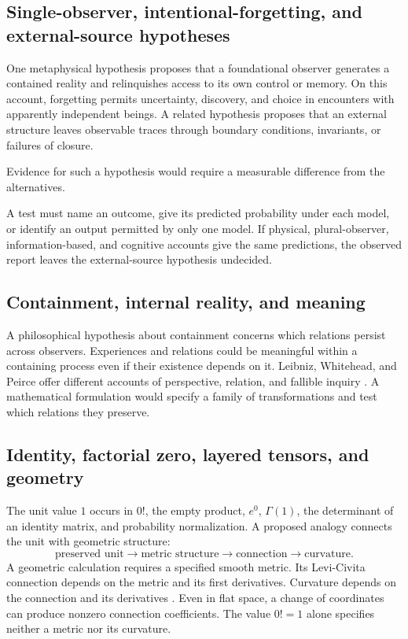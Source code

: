 \subsection{Single-observer, intentional-forgetting, and external-source hypotheses}

One metaphysical hypothesis proposes that a foundational observer generates a contained reality and relinquishes access to its own control or memory. On this account, forgetting permits uncertainty, discovery, and choice in encounters with apparently independent beings. A related hypothesis proposes that an external structure leaves observable traces through boundary conditions, invariants, or failures of closure.

Evidence for such a hypothesis would require a measurable difference from the alternatives.



A test must name an outcome, give its predicted probability under each model, or identify an output permitted by only one model. If physical, plural-observer, information-based, and cognitive accounts give the same predictions, the observed report leaves the external-source hypothesis undecided.

\subsection{Containment, internal reality, and meaning}

A philosophical hypothesis about containment concerns which relations persist across observers. Experiences and relations could be meaningful within a containing process even if their existence depends on it. Leibniz, Whitehead, and Peirce offer different accounts of perspective, relation, and fallible inquiry \parencite{Leibniz1989,Whitehead1978,Peirce1877,Peirce1878}. A mathematical formulation would specify a family of transformations and test which relations they preserve.

\subsection{Identity, factorial zero, layered tensors, and geometry}

The unit value \(1\) occurs in \(0!\), the empty product, \(e^0\), \(\Gamma(1)\), the determinant of an identity matrix, and probability normalization. A proposed analogy connects the unit with geometric structure:
\[
\text{preserved unit}\longrightarrow
\text{metric structure}\longrightarrow
\text{connection}\longrightarrow
\text{curvature}.
\]
A geometric calculation requires a specified smooth metric. Its Levi-Civita connection depends on the metric and its first derivatives. Curvature depends on the connection and its derivatives \parencite{Nakahara2003}. Even in flat space, a change of coordinates can produce nonzero connection coefficients. The value \(0!=1\) alone specifies neither a metric nor its curvature.

